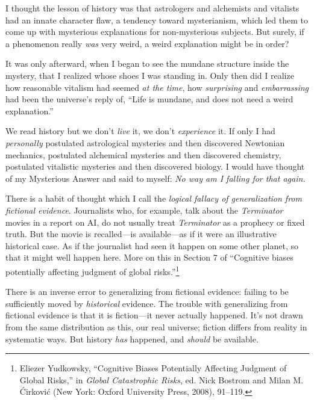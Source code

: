 {
 I thought the lesson of history was that astrologers and
alchemists and vitalists had an innate character flaw, a tendency
toward mysterianism, which led them to come up with mysterious
explanations for non-mysterious subjects. But surely, if a phenomenon
really \textit{was} very weird, a weird explanation might be in order?}

{
 It was only afterward, when I began to see the mundane structure
inside the mystery, that I realized whose shoes I was standing in. Only
then did I realize how reasonable vitalism had seemed \textit{at the
time}, how \textit{surprising} and \textit{embarrassing} had been the
universe's reply of, ``Life is
mundane, and does not need a weird explanation.''}

{
 We read history but we don't \textit{live} it, we
don't \textit{experience} it. If only I had
\textit{personally} postulated astrological mysteries and then
discovered Newtonian mechanics, postulated alchemical mysteries and
then discovered chemistry, postulated vitalistic mysteries and then
discovered biology. I would have thought of my Mysterious Answer and
said to myself: \textit{No way am I falling for that again.}}

\myendsectiontext


{
 There is a habit of thought which I call the \textit{logical
fallacy of generalization from fictional evidence}. Journalists who,
for example, talk about the \textit{Terminator} movies in a report on
AI, do not usually treat \textit{Terminator} as a prophecy or fixed
truth. But the movie is recalled---is available{}---as if it were an
illustrative historical case. As if the journalist had seen it happen
on some other planet, so that it might well happen here. More on this
in Section 7 of ``Cognitive biases potentially
affecting judgment of global
risks.''\footnote{Eliezer Yudkowsky, ``Cognitive Biases
Potentially Affecting Judgment of Global Risks,'' in
\textit{Global Catastrophic Risks}, ed. Nick Bostrom and Milan M.
\'Cirkovi\'c (New York: Oxford University Press, 2008), 91--119.} }

{
 There is an inverse error to generalizing from fictional evidence:
failing to be sufficiently moved by \textit{historical} evidence. The
trouble with generalizing from fictional evidence is that it is
fiction---it never actually happened. It's not drawn
from the same distribution as this, our real universe; fiction differs
from reality in systematic ways. But history \textit{has} happened, and
\textit{should} be available.}

